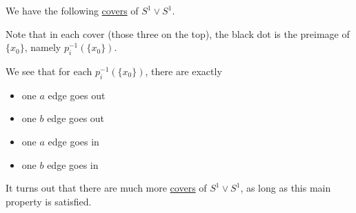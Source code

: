 
\begin{eg}
	We have the following \hyperref[def:covering-map]{covers} of \(S^1 \vee S^1\).
	\begin{figure}[H]
		\centering
		\label{fig:eg:lec14:1}
	\end{figure}
	Note that in each cover (those three on the top), the black dot is the preimage of \(\{x_0\}\), namely \(p_{i}^{-1} (\{x_0\})\).
	\begin{remark}
		We see that for each \(p_{i}^{-1} (\{x_0\})\), there are exactly
		\begin{itemize}
			\item one \(a\) edge goes out
			\item one \(b\) edge goes out
			\item one \(a\) edge goes in
			\item one \(b\) edge goes in
		\end{itemize}

		It turns out that there are much more \hyperref[def:covering-map]{covers} of \(S^1\vee S^1\), as long as this main property is satisfied.
	\end{remark}
\end{eg}

